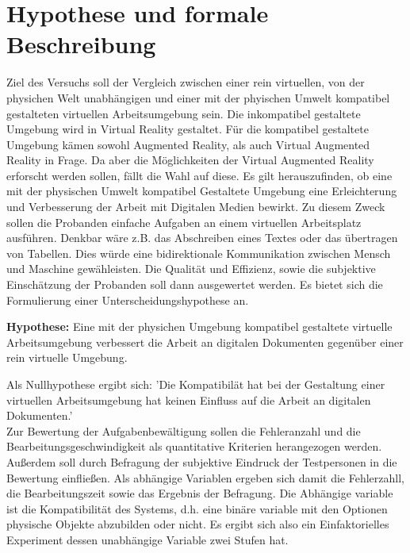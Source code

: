 \documentclass[12pt,a4paper,bibliography=totocnumbered,listof=totocnumbered]{scrartcl}
\begin{document}
\section{Hypothese und formale Beschreibung}
Ziel des Versuchs soll der Vergleich zwischen einer rein virtuellen, von der physichen Welt unabhängigen und einer mit der phyischen Umwelt kompatibel gestalteten virtuellen Arbeitsumgebung sein.
Die inkompatibel gestaltete Umgebung wird in Virtual Reality gestaltet. Für die kompatibel gestaltete Umgebung kämen sowohl Augmented Reality, als auch Virtual Augmented Reality in Frage. Da aber die Möglichkeiten der Virtual Augmented Reality erforscht werden sollen, fällt die Wahl auf diese.
Es gilt herauszufinden, ob eine mit der physischen Umwelt kompatibel Gestaltete Umgebung eine Erleichterung und Verbesserung der Arbeit mit Digitalen Medien bewirkt. Zu diesem Zweck sollen die Probanden einfache Aufgaben an einem virtuellen Arbeitsplatz ausführen. Denkbar wäre z.B. das Abschreiben eines Textes oder das übertragen von Tabellen. Dies würde eine bidirektionale Kommunikation zwischen Mensch und Maschine gewähleisten. Die Qualität und Effizienz, sowie die subjektive Einschätzung der Probanden soll dann ausgewertet werden.
Es bietet sich die Formulierung einer Unterscheidungshypothese an.\\
\vspace{1em}
\begin{center}
\textbf{Hypothese:}
Eine mit der physichen Umgebung kompatibel gestaltete virtuelle Arbeitsumgebung verbessert die Arbeit an digitalen Dokumenten gegenüber einer rein virtuelle Umgebung.
\end{center}
\vspace{1em}
Als Nullhypothese ergibt sich: 'Die Kompatibilät hat bei der Gestaltung einer virtuellen Arbeitsumgebung hat keinen Einfluss auf die Arbeit an digitalen Dokumenten.'\\
Zur Bewertung der Aufgabenbewältigung sollen die Fehleranzahl und die Bearbeitungsgeschwindigkeit als quantitative Kriterien herangezogen werden. Außerdem soll durch Befragung der subjektive Eindruck der Testpersonen in die Bewertung einfließen.
Als abhängige Variablen ergeben sich damit die Fehlerzahll, die Bearbeitungszeit sowie das Ergebnis der Befragung.
Die Abhängige variable ist die Kompatibilität des Systems, d.h. eine binäre variable mit  den Optionen physische Objekte abzubilden oder nicht. Es ergibt sich also ein Einfaktorielles Experiment dessen unabhängige Variable zwei Stufen hat.
\end{document}
